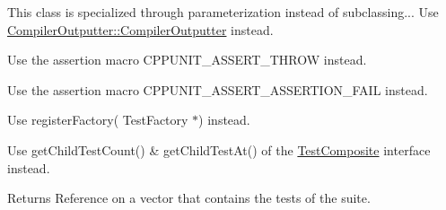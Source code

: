 \begin{DoxyRefList}
\item[\label{deprecated__deprecated000004}%
\hypertarget{deprecated__deprecated000004}{}%
Member \hyperlink{class_compiler_outputter_aa0f8f9b1fb25fe8873b7454f91dcc929}{Compiler\-Outputter\-:\-:default\-Outputter} (\hyperlink{class_test_result_collector}{Test\-Result\-Collector} $\ast$result, O\-Stream \&stream)]This class is specialized through parameterization instead of subclassing... Use \hyperlink{class_compiler_outputter_a8dd6679e24c18b3ca54a4266d9d1b812}{Compiler\-Outputter\-::\-Compiler\-Outputter} instead.  
\item[\label{deprecated__deprecated000005}%
\hypertarget{deprecated__deprecated000005}{}%
Member \hyperlink{group___writing_test_fixture_gaca8eeb6f60714baade6cbfd185868c40}{C\-P\-P\-U\-N\-I\-T\-\_\-\-T\-E\-S\-T\-\_\-\-E\-X\-C\-E\-P\-T\-I\-O\-N} (test\-Method, Exception\-Type)]Use the assertion macro C\-P\-P\-U\-N\-I\-T\-\_\-\-A\-S\-S\-E\-R\-T\-\_\-\-T\-H\-R\-O\-W instead.  
\item[\label{deprecated__deprecated000006}%
\hypertarget{deprecated__deprecated000006}{}%
Member \hyperlink{group___writing_test_fixture_ga5bdaf0444216a8f93ead13d5ae964d7e}{C\-P\-P\-U\-N\-I\-T\-\_\-\-T\-E\-S\-T\-\_\-\-F\-A\-I\-L} (test\-Method)]Use the assertion macro C\-P\-P\-U\-N\-I\-T\-\_\-\-A\-S\-S\-E\-R\-T\-\_\-\-A\-S\-S\-E\-R\-T\-I\-O\-N\-\_\-\-F\-A\-I\-L instead.  
\item[\label{deprecated__deprecated000007}%
\hypertarget{deprecated__deprecated000007}{}%
Member \hyperlink{class_test_factory_registry_aff8d8215ec83fbb77d46706264e2f161}{Test\-Factory\-Registry\-:\-:register\-Factory} (const std\-::string \&name, \hyperlink{class_test_factory}{Test\-Factory} $\ast$factory)]Use register\-Factory( Test\-Factory $\ast$) instead.  
\item[\label{deprecated__deprecated000008}%
\hypertarget{deprecated__deprecated000008}{}%
Member \hyperlink{class_test_suite_ad2bd3e20523bb357b7a4608a7978ea49}{Test\-Suite\-:\-:get\-Tests} () const ]Use get\-Child\-Test\-Count() \& get\-Child\-Test\-At() of the \hyperlink{class_test_composite}{Test\-Composite} interface instead. \begin{DoxyReturn}{Returns}
Reference on a vector that contains the tests of the suite.  
\end{DoxyReturn}


\end{DoxyRefList}
